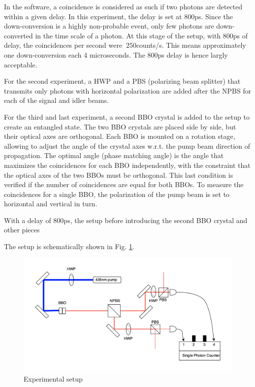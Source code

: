 \documentclass[a4paper, 12pt,oneside]{article}
\begin{document}
In the software, a coincidence is considered as such if two photons are detected within a given delay. In this experiment, the delay is set at $800$ps. Since the down-conversion is a highly non-probable event, only few photons are down-converted in the time scale of a photon. At this stage of the setup, with $800$ps of delay, the coincidences per second were $~250$counts/s. This means approximately one down-conversion each 4 microseconds. The $800$ps delay is hence largly acceptable.

For the second experiment, a HWP and a PBS (polarizing beam splitter) that transmits only photons with horizontal polarization are added after the NPBS for each of the signal and idler beams. 

For the third and last experiment, a second BBO crystal is added to the setup to create an entangled state. The two BBO crystals are placed side by side, but their optical axes are orthogonal. Each BBO is mounted on a rotation stage, allowing to adjust the angle of the crystal axes w.r.t. the pump beam direction of propagation. The optimal angle (phase matching angle) is the angle that maximizes the coincidences for each BBO independently, with the constraint that the optical axes of the two BBOs must be orthogonal. This last condition is verified if the number of coincidences are equal for both BBOs. To measure the coincidences for a single BBO, the polarization of the pump beam is set to horizontal and vertical in turn. 



With a delay of $800$ps, the setup before introducing the second BBO crystal and other pieces


The setup is schematically shown in Fig. \ref{fig:setup}.
\begin{figure}[H]
    \centering
    \includegraphics[width=1\textwidth]{Figures/Experimental setup.png}
    \caption{Experimental setup}
    \label{fig:setup}
\end{figure}
\end{document}
